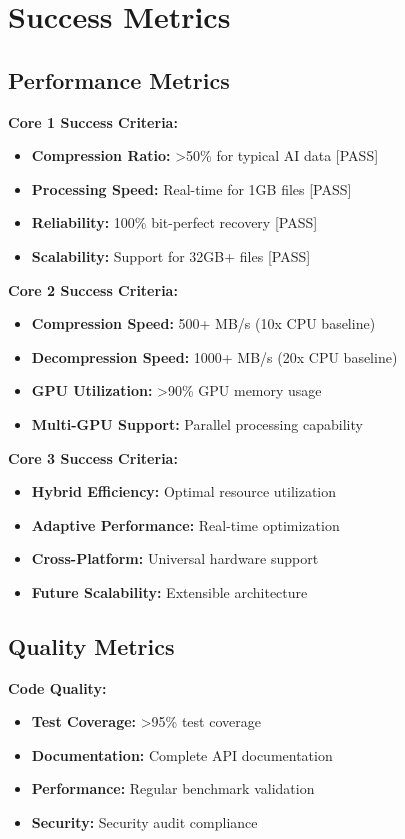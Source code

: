 \documentclass[12pt,a4paper]{article}
\begin{document}
\section{Success Metrics}

\subsection{Performance Metrics}

\textbf{Core 1 Success Criteria:}
\begin{itemize}
    \item \textbf{Compression Ratio:} >50\% for typical AI data [PASS]
    \item \textbf{Processing Speed:} Real-time for 1GB files [PASS]
    \item \textbf{Reliability:} 100\% bit-perfect recovery [PASS]
    \item \textbf{Scalability:} Support for 32GB+ files [PASS]
\end{itemize}

\textbf{Core 2 Success Criteria:}
\begin{itemize}
    \item \textbf{Compression Speed:} 500+ MB/s (10x CPU baseline)
    \item \textbf{Decompression Speed:} 1000+ MB/s (20x CPU baseline)
    \item \textbf{GPU Utilization:} >90\% GPU memory usage
    \item \textbf{Multi-GPU Support:} Parallel processing capability
\end{itemize}

\textbf{Core 3 Success Criteria:}
\begin{itemize}
    \item \textbf{Hybrid Efficiency:} Optimal resource utilization
    \item \textbf{Adaptive Performance:} Real-time optimization
    \item \textbf{Cross-Platform:} Universal hardware support
    \item \textbf{Future Scalability:} Extensible architecture
\end{itemize}

\subsection{Quality Metrics}

\textbf{Code Quality:}
\begin{itemize}
    \item \textbf{Test Coverage:} >95\% test coverage
    \item \textbf{Documentation:} Complete API documentation
    \item \textbf{Performance:} Regular benchmark validation
    \item \textbf{Security:} Security audit compliance
\end{itemize}
\end{document}

